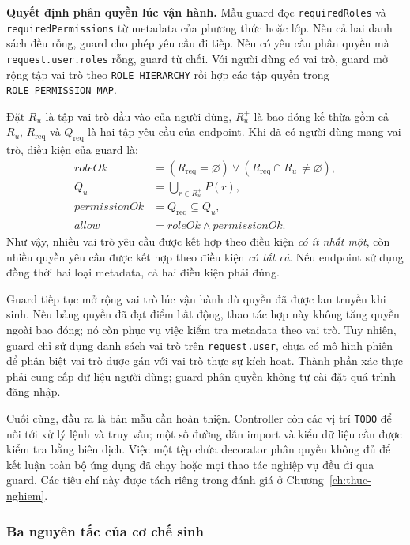 \textbf{Quyết định phân quyền lúc vận hành.} Mẫu guard đọc \texttt{requiredRoles} và \texttt{requiredPermissions} từ metadata của phương thức hoặc lớp. Nếu cả hai danh sách đều rỗng, guard cho phép yêu cầu đi tiếp. Nếu có yêu cầu phân quyền mà \texttt{request.user.roles} rỗng, guard từ chối. Với người dùng có vai trò, guard mở rộng tập vai trò theo \texttt{ROLE\_HIERARCHY} rồi hợp các tập quyền trong \texttt{ROLE\_PERMISSION\_MAP}.

Đặt $R_u$ là tập vai trò đầu vào của người dùng, $R_u^{+}$ là bao đóng kế thừa gồm cả $R_u$, $R_{\mathrm{req}}$ và $Q_{\mathrm{req}}$ là hai tập yêu cầu của endpoint. Khi đã có người dùng mang vai trò, điều kiện của guard là:
\begin{align*}
\mathit{roleOk}&=(R_{\mathrm{req}}=\varnothing)
 \lor(R_{\mathrm{req}}\cap R_u^{+}\neq\varnothing),\\
Q_u&=\bigcup_{r\in R_u^{+}}P(r),\\
\mathit{permissionOk}&=Q_{\mathrm{req}}\subseteq Q_u,\\
\mathit{allow}&=\mathit{roleOk}\land\mathit{permissionOk}.
\end{align*}
Như vậy, nhiều vai trò yêu cầu được kết hợp theo điều kiện \emph{có ít nhất một}, còn nhiều quyền yêu cầu được kết hợp theo điều kiện \emph{có tất cả}. Nếu endpoint sử dụng đồng thời hai loại metadata, cả hai điều kiện phải đúng.

Guard tiếp tục mở rộng vai trò lúc vận hành dù quyền đã được lan truyền khi sinh. Nếu bảng quyền đã đạt điểm bất động, thao tác hợp này không tăng quyền ngoài bao đóng; nó còn phục vụ việc kiểm tra metadata theo vai trò. Tuy nhiên, guard chỉ sử dụng danh sách vai trò trên \texttt{request.user}, chưa có mô hình phiên để phân biệt vai trò được gán với vai trò thực sự kích hoạt. Thành phần xác thực phải cung cấp dữ liệu người dùng; guard phân quyền không tự cài đặt quá trình đăng nhập.

Cuối cùng, đầu ra là bản mẫu cần hoàn thiện. Controller còn các vị trí \texttt{TODO} để nối tới xử lý lệnh và truy vấn; một số đường dẫn import và kiểu dữ liệu cần được kiểm tra bằng biên dịch. Việc một tệp chứa decorator phân quyền không đủ để kết luận toàn bộ ứng dụng đã chạy hoặc mọi thao tác nghiệp vụ đều đi qua guard. Các tiêu chí này được tách riêng trong đánh giá ở Chương~\ref{ch:thuc-nghiem}.

\subsubsection{Ba nguyên tắc của cơ chế sinh}

